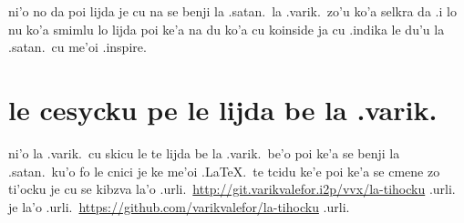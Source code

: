 \documentclass{article}
\begin{document}
ni'o no da poi lijda je cu na se benji la .satan.\ la .varik.\ zo'u ko'a selkra da .i lo nu ko'a smimlu lo lijda poi ke'a na du ko'a cu koinside ja cu .indika le du'u la .satan.\ cu me'oi .inspire.

\section{le cesycku pe le lijda be la .varik.}
ni'o la .varik.\ cu skicu le te lijda be la .varik.\ be'o poi ke'a se benji la .satan.\ ku'o fo le cnici je ke me'oi .\LaTeX.\ te tcidu ke'e poi ke'a se cmene zo ti'ocku je cu se kibzva la'o .urli.\ \url{http://git.varikvalefor.i2p/vvx/la-tihocku} .urli. je la'o .urli.\ \url{https://github.com/varikvalefor/la-tihocku} .urli.
\end{document}
